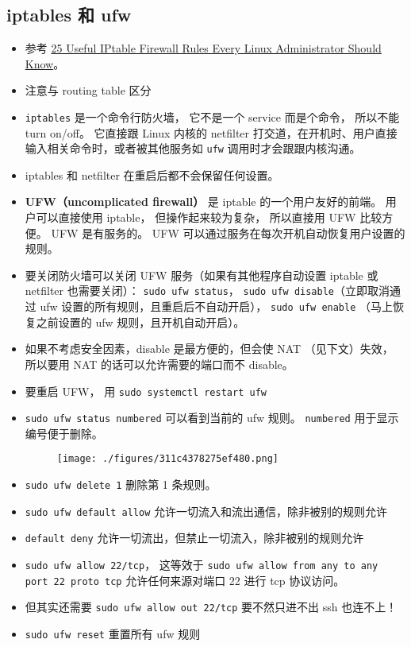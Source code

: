 \subsection{iptables 和 ufw}
\begin{itemize}
\item 参考 \href{https://www.tecmint.com/linux-iptables-firewall-rules-examples-commands/}{25 Useful IPtable Firewall Rules Every Linux Administrator Should Know}。
\item 注意与 routing table 区分
\item \verb|iptables| 是一个命令行防火墙， 它不是一个 service 而是个命令， 所以不能 turn on/off。 它直接跟 Linux 内核的 netfilter 打交道，在开机时、用户直接输入相关命令时，或者被其他服务如 \verb`ufw` 调用时才会跟跟内核沟通。
\item iptables 和 netfilter 在重启后都不会保留任何设置。
\item \textbf{UFW（uncomplicated firewall）} 是 iptable 的一个用户友好的前端。 用户可以直接使用 iptable， 但操作起来较为复杂， 所以直接用 UFW 比较方便。 UFW 是有服务的。 UFW 可以通过服务在每次开机自动恢复用户设置的规则。
\item 要关闭防火墙可以关闭 UFW 服务（如果有其他程序自动设置 iptable 或 netfilter 也需要关闭）： \verb|sudo ufw status|， \verb|sudo ufw disable|（立即取消通过 ufw 设置的所有规则，且重启后不自动开启）， \verb|sudo ufw enable| （马上恢复之前设置的 ufw 规则，且开机自动开启）。
\item 如果不考虑安全因素，disable 是最方便的，但会使 NAT （见下文）失效， 所以要用 NAT 的话可以允许需要的端口而不 disable。
\item 要重启 UFW， 用 \verb|sudo systemctl restart ufw|
\item \verb`sudo ufw status numbered` 可以看到当前的 ufw 规则。 \verb`numbered` 用于显示编号便于删除。
\begin{figure}[ht]
\centering
\texttt{[image: ./figures/311c4378275ef480.png]}
\caption{} \label{fig_LinWeb_2}
\end{figure}
\item \verb`sudo ufw delete 1` 删除第 1 条规则。
\item \verb`sudo ufw default allow` 允许一切流入和流出通信，除非被别的规则允许
\item \verb`default deny` 允许一切流出，但禁止一切流入，除非被别的规则允许
\item \verb`sudo ufw allow 22/tcp`， 这等效于 \verb`sudo ufw allow from any to any port 22 proto tcp` 允许任何来源对端口 22 进行 tcp 协议访问。
\item 但其实还需要 \verb`sudo ufw allow out 22/tcp` 要不然只进不出 ssh 也连不上！
\item \verb`sudo ufw reset` 重置所有 ufw 规则
\end{itemize}

